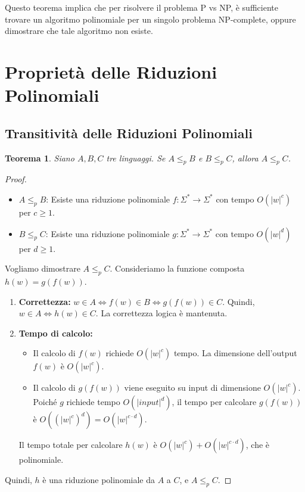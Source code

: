 \documentclass[a4paper, 11pt]{book} %
\newtheorem{theorem}{Teorema}[section]
\theoremstyle{definition}
\begin{document}
Questo teorema implica che per risolvere il problema P vs NP, è sufficiente trovare un algoritmo polinomiale per un singolo problema NP-complete, oppure dimostrare che tale algoritmo non esiste.

\section{Proprietà delle Riduzioni Polinomiali}

\subsection{Transitivit\`a delle Riduzioni Polinomiali}

\begin{theorem}
Siano $A, B, C$ tre linguaggi. Se $A \le_p B$ e $B \le_p C$, allora $A \le_p C$.
\end{theorem}

\begin{proof}
\begin{itemize}
    \item $A \le_p B$: Esiste una riduzione polinomiale $f: \Sigma^* \to \Sigma^*$ con tempo $O(|w|^c)$ per $c \ge 1$.
    \item $B \le_p C$: Esiste una riduzione polinomiale $g: \Sigma^* \to \Sigma^*$ con tempo $O(|w|^d)$ per $d \ge 1$.
\end{itemize}
Vogliamo dimostrare $A \le_p C$.
Consideriamo la funzione composta $h(w) = g(f(w))$.
\begin{enumerate}
    \item \textbf{Correttezza:} $w \in A \iff f(w) \in B \iff g(f(w)) \in C$. Quindi, $w \in A \iff h(w) \in C$. La correttezza logica è mantenuta.
    \item \textbf{Tempo di calcolo:}
    \begin{itemize}
        \item Il calcolo di $f(w)$ richiede $O(|w|^c)$ tempo. La dimensione dell'output $f(w)$ è $O(|w|^c)$.
        \item Il calcolo di $g(f(w))$ viene eseguito su input di dimensione $O(|w|^c)$. Poiché $g$ richiede tempo $O(|input|^d)$, il tempo per calcolare $g(f(w))$ è $O((|w|^c)^d) = O(|w|^{c \cdot d})$.
    \end{itemize}
    Il tempo totale per calcolare $h(w)$ è $O(|w|^c) + O(|w|^{c \cdot d})$, che è polinomiale.
\end{enumerate}
Quindi, $h$ è una riduzione polinomiale da $A$ a $C$, e $A \le_p C$.
\end{proof}
\end{document}

